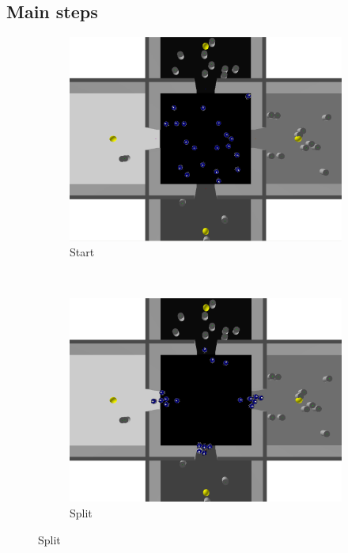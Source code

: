\newpage
\subsection{Main steps}

\begin{figure}[h!]
        \centering
        \begin{subfigure}[b]{0.5\textwidth}
            \includegraphics[width=\textwidth]{images/1_start.png}
            \caption{Start}
        \end{subfigure}%
        ~
        \begin{subfigure}[b]{0.5\textwidth}
            \includegraphics[width=\textwidth]{images/2_split.png}
            \caption{Split}

\end{subfigure}
\end{figure}
